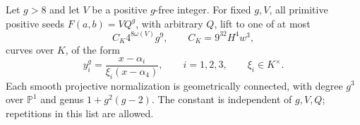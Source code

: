 \begin{theorem}\label{qc-cover-count}
Let $g>8$ and let $V$ be a positive $g$-free integer. For fixed $g,V$,
all primitive positive seeds $F(a,b)=VQ^g$, with arbitrary $Q$, lift to
one of at most
\begin{equation}\label{qc-count}
 C_K4^{8\omega(V)}g^9,\qquad C_K=9^{32}H^4w^3,
\end{equation}
curves over $K$, of the form
\begin{equation}\label{qc-covers}
 y_i^g=\frac{x-\alpha_i}{\xi_i(x-\alpha_4)},\qquad i=1,2,3,
 \qquad \xi_i\in K^\times.
\end{equation}
Each smooth projective normalization is geometrically connected, with
degree $g^3$ over $\mathbb P^1$ and genus $1+g^2(g-2)$.
The constant is independent of $g,V,Q$; repetitions in this list are
allowed.
\end{theorem}
